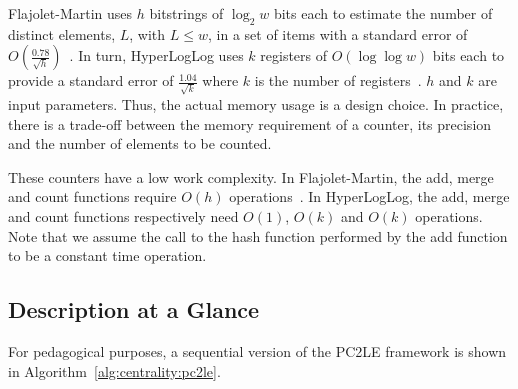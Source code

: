 Flajolet-Martin uses $h$ bitstrings of $\log_2 w$ bits each to estimate the number of distinct elements, $L$, with $L \leq w$, in a set of items with a standard error of $O(\frac{0.78}{\sqrt{h}})$~\cite{flajolet1985probabilistic}. In turn, HyperLogLog uses $k$ registers of $O(\log \log w)$ bits each to provide a standard error of $\frac{1.04}{\sqrt{k}}$ where $k$ is the number of registers~\cite{flajolet2007hyperloglog}. $h$ and $k$ are input parameters. Thus, the actual memory usage is a design choice. In practice, there is a trade-off between the memory requirement of a counter, its precision and the number of elements to be counted.

These counters have a low work complexity. In Flajolet-Martin, the add, merge and count functions require $O(h)$ operations~\cite{gibbons2016distinct}. In HyperLogLog, the add, merge and count functions respectively need $O(1)$, $O(k)$ and $O(k)$ operations. Note that we assume the call to the hash function performed by the add function to be a constant time operation.

\subsection{Description at a Glance}
\label{section:centrality:pc2le-description}

For pedagogical purposes, a sequential version of the PC2LE framework is shown in Algorithm~\ref{alg:centrality:pc2le}. 

